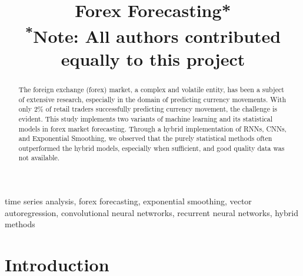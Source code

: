 \documentclass[conference]{IEEEtran}
\begin{document}
    \makeatletter
    \newcommand{\linebreakand}{%
      \end{@IEEEauthorhalign}
      \hfill\mbox{}\par
      \mbox{}\hfill\begin{@IEEEauthorhalign}
    }
    \makeatother

\title{Forex Forecasting*\\
{\footnotesize \textsuperscript{*}Note: All authors contributed equally to this project}
}

\author{
\and
{}
\and
{}
}
\newcommand{\ra}[1]{\renewcommand{\arraystretch}{#1}}
\maketitle

\begin{abstract}
The foreign exchange (forex) market, a complex and volatile entity, has been a subject of extensive research, especially in the domain of predicting currency movements. With only 2\% of retail traders successfully predicting currency movement, the challenge is evident. This study implements two variants of machine learning and its statistical models in forex market forecasting. Through a hybrid implementation of RNNs, CNNs, and Exponential Smoothing, we observed that the purely statistical methods often outperformed the hybrid models, especially when sufficient, and good quality data was not available.
\end{abstract}

\begin{IEEEkeywords}
time series analysis, forex forecasting, exponential smoothing, vector autoregression, convolutional neural netwrorks, recurrent neural networks, hybrid methods 
\end{IEEEkeywords}

\section{Introduction}
\end{document}
